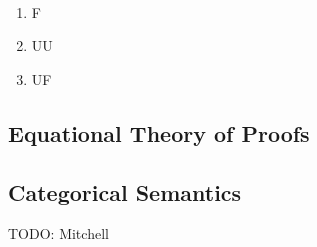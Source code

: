 \begin{theorem}[Fusion] ~
\begin{enumerate} 
\item F
\item UU
\item UF
\end{enumerate}
\end{theorem}

\subsection{Equational Theory of Proofs}

\subsection{Categorical Semantics}

TODO: Mitchell
